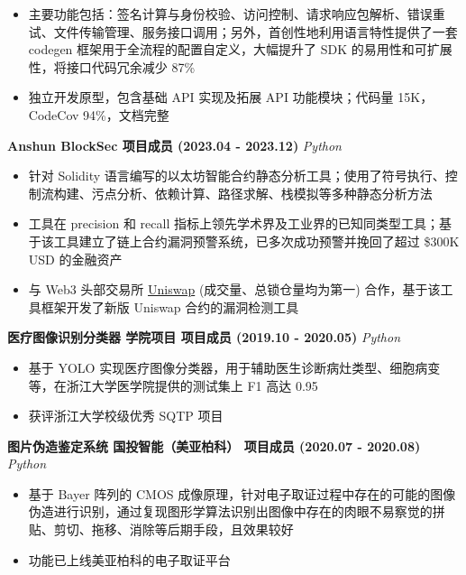     \begin{itemize}
        \item 主要功能包括：签名计算与身份校验、访问控制、请求响应包解析、错误重试、文件传输管理、服务接口调用；另外，首创性地利用语言特性提供了一套 codegen 框架用于全流程的配置自定义，大幅提升了 SDK 的易用性和可扩展性，将接口代码冗余减少 87\%
        \item 独立开发原型，包含基础 API 实现及拓展 API 功能模块；代码量 15K，CodeCov 94\%，文档完整
    \end{itemize}

    \noindent\textbf{Anshun \textbar{} BlockSec \textbar{} 项目成员 (2023.04 - 2023.12)} \hfill \textsl{Python}

    \begin{itemize}
        \item 针对 Solidity 语言编写的以太坊智能合约静态分析工具；使用了符号执行、控制流构建、污点分析、依赖计算、路径求解、栈模拟等多种静态分析方法
        \item 工具在 precision 和 recall 指标上领先学术界及工业界的已知同类型工具；基于该工具建立了链上合约漏洞预警系统，已多次成功预警并挽回了超过 \$300K USD 的金融资产
        \item 与 Web3 头部交易所 \href{https://defillama.com/protocols/Dexes}{Uniswap} (成交量、总锁仓量均为第一) 合作，基于该工具框架开发了新版 Uniswap 合约的漏洞检测工具
    \end{itemize}

    \ifdefined\qr

        \noindent\textbf{医疗图像识别分类器 \textbar{} 学院项目 \textbar{} 项目成员 (2019.10 - 2020.05)} \hfill \textsl{Python}

        \begin{itemize}
            \item 基于 YOLO 实现医疗图像分类器，用于辅助医生诊断病灶类型、细胞病变等，在浙江大学医学院提供的测试集上 F1 高达 0.95
            \item 获评浙江大学校级优秀 SQTP 项目
        \end{itemize}

        \noindent\textbf{图片伪造鉴定系统 \textbar{} 国投智能（美亚柏科）\textbar{} 项目成员 (2020.07 - 2020.08)} \hfill \textsl{Python}

        \begin{itemize}
            \item 基于 Bayer 阵列的 CMOS 成像原理，针对电子取证过程中存在的可能的图像伪造进行识别，通过复现图形学算法识别出图像中存在的肉眼不易察觉的拼贴、剪切、拖移、消除等后期手段，且效果较好
            \item 功能已上线美亚柏科的电子取证平台
        \end{itemize}


